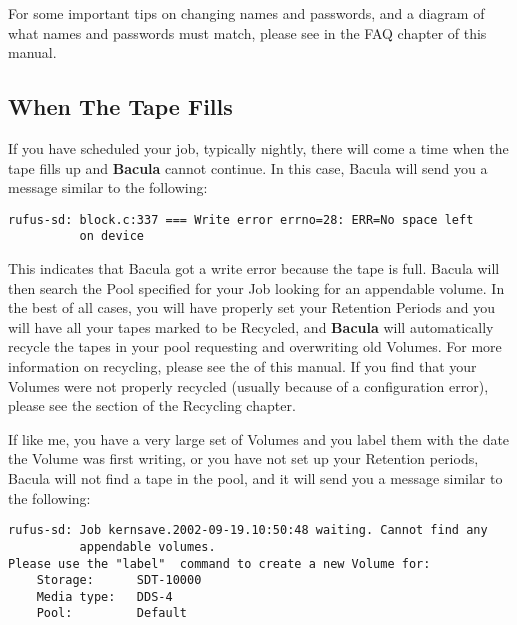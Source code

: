{{For some important tips on changing names and passwords, and a diagram of what
names and passwords must match, please see 
 in the FAQ chapter
of this manual. 

\subsection*{When The Tape Fills}
\label{FullTape}

If you have scheduled your job, typically nightly, there will come a time when
the tape fills up and {\bf Bacula} cannot continue. In this case, Bacula will
send you a message similar to the following: 

\footnotesize
\begin{verbatim}
rufus-sd: block.c:337 === Write error errno=28: ERR=No space left
          on device
\end{verbatim}
\normalsize

This indicates that Bacula got a write error because the tape is full. Bacula
will then search the Pool specified for your Job looking for an appendable
volume. In the best of all cases, you will have properly set your Retention
Periods and you will have all your tapes marked to be Recycled, and {\bf
Bacula} will automatically recycle the tapes in your pool requesting and
overwriting old Volumes. For more information on recycling, please see the 
 of this manual. If you
find that your Volumes were not properly recycled (usually because of a
configuration error), please see the 
 section of
the Recycling chapter. 

If like me, you have a very large set of Volumes and you label them with the
date the Volume was first writing, or you have not set up your Retention
periods, Bacula will not find a tape in the pool, and it will send you a
message similar to the following: 

\footnotesize
\begin{verbatim}
rufus-sd: Job kernsave.2002-09-19.10:50:48 waiting. Cannot find any
          appendable volumes.
Please use the "label"  command to create a new Volume for:
    Storage:      SDT-10000
    Media type:   DDS-4
    Pool:         Default
\end{verbatim}
\normalsize

}}
